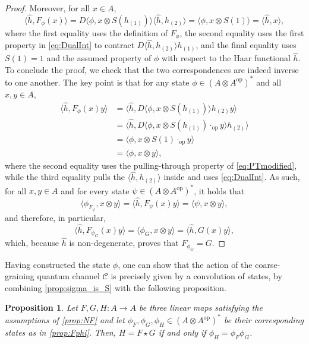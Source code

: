 \documentclass[a4paper,10pt]{amsart}
\newcommand{\Coarse}{\mathcal{C}}
\newcommand{\eval}[2]{\langle #1 , #2\rangle}
\newtheorem{proposition}[theorem]{Proposition}
\theoremstyle{definition}
\begin{document}
\begin{proof}
    \smallbreak\noindent%
	Moreover, for all $x\in A$,
	\begin{equation}
		\eval{ \hat{h} }{ F_\phi(x) }
		=
		D
        \eval{ \phi }{ x\otimes S(h_{(1)}) }
        \eval{ \hat{h} }{ h_{(2)} }
		=
		\eval{ \phi }{ x\otimes S(1) }
		=
		\eval{ \hat{h} }{ x },
	\end{equation}
    where the first equality uses the definition of $F_\phi$, the second equality uses the first property in \cref{eq:DualInt} to contract $D \eval{\hat{h}}{h_{(2)}}h_{(1)}$, and the final equality uses $S(1)=1$ and the assumed property of $\phi$ with respect to the Haar functional $\hat{h}$.
    \smallbreak\noindent%
	To conclude the proof, we check that the two correspondences are indeed inverse to one another. The key point is that for any state $\phi\in (A\otimes A^{\mathrm{op}})^*$ and all $x,y\in A$,
    \begin{align*}
        \eval{ \hat{h} }{ F_\phi(x) y }
        &= \eval{ \hat{h} }{ D \eval{ \phi }{ x  \otimes S(h_{(1)}) } h_{(2)} y }\\
        &= \eval{ \hat{h} }{ D \eval{ \phi }{ x  \otimes S(h_{(1)})\cdot_{\mathrm{op}} y } h_{(2)}}\\
        &= \eval{ \phi }{ x  \otimes  S(1) \cdot_{\mathrm{op}}y }\\
        &= \eval{ \phi }{ x \otimes y },
    \end{align*}
    where the second equality uses the pulling-through property of \cref{eq:PTmodified}, while the third equality pulls the $\eval{\hat{h}}{h_{(2)}}$ inside and uses \cref{eq:DualInt}.
    As such, for all $x,y\in A$ and for every state $\psi\in (A \otimes A^{\mathrm{op}})^*$, it holds that
	\[
		\eval{ \phi_{F_\psi} }{ x \otimes y } =
		\eval{ \hat{h} }{ F_\psi(x) y } =
		\eval{ \psi }{ x \otimes y },
	\]
    and therefore, in particular,
	\[
		\eval{ \hat{h} }{ F_{\phi_G}(x) y }
        =
		\eval{ \phi_G }{ x \otimes  y }
		=
		\eval{ \hat{h} }{ G(x) y },
	\]
    which, because $\hat{h}$ is non-degenerate, proves that $F_{\phi_G} = G$.
\end{proof}

Having constructed the state $\phi$, one can show that the action of the coarse-graining quantum channel $\Coarse$ is precisely given by a convolution of states, by combining \cref{prop:sigma_is_S} with the following proposition.

\begin{proposition}\label{prop:sigma_is_convolution}
	Let $F,G,H:A\to A$ be three linear maps satisfying the assumptions of \cref{prop:NF} and let $\phi_F,\phi_G,\phi_H\in (A\otimes A^{\mathrm{op}})^*$ be their corresponding states as in \cref{prop:Fphi}.
	Then, $H = F \star G$ if and only if $ \phi_H = \phi_F \phi_G$.
\end{proposition}
\end{document}
